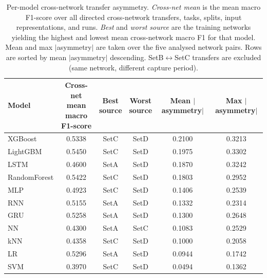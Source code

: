 \begin{table}[htbp]
\caption{Per-model cross-network transfer asymmetry. \textit{Cross-net mean} is the mean macro F1-score over all directed cross-network transfers, tasks, splits, input representations, and runs. \textit{Best} and \textit{worst source} are the training networks yielding the highest and lowest mean cross-network macro F1 for that model. Mean and max $|$asymmetry$|$ are taken over the five analysed network pairs. Rows are sorted by mean $|$asymmetry$|$ descending. SetB$\leftrightarrow$SetC transfers are excluded (same network, different capture period).}
\label{tab:q4_models}
\centering
\begin{tabular}{lccccc}
\toprule
Model & \makecell{Cross-net mean \\ macro F1-score} & \makecell{Best \\ source} & \makecell{Worst \\ source} & Mean $|$asymmetry$|$ & Max $|$asymmetry$|$ \\
\midrule
XGBoost & 0.5338 & SetC & SetD & 0.2100 & 0.3213 \\
LightGBM & 0.5450 & SetC & SetD & 0.1975 & 0.3302 \\
LSTM & 0.4600 & SetA & SetD & 0.1870 & 0.3242 \\
RandomForest & 0.5422 & SetC & SetD & 0.1803 & 0.2952 \\
MLP & 0.4923 & SetC & SetD & 0.1406 & 0.2539 \\
RNN & 0.5155 & SetA & SetD & 0.1332 & 0.2314 \\
GRU & 0.5258 & SetA & SetD & 0.1300 & 0.2648 \\
NN & 0.4300 & SetA & SetC & 0.1083 & 0.2529 \\
kNN & 0.4358 & SetC & SetD & 0.1000 & 0.2058 \\
LR & 0.5296 & SetA & SetD & 0.0944 & 0.1742 \\
SVM & 0.3970 & SetC & SetD & 0.0494 & 0.1362 \\
\bottomrule
\end{tabular}
\end{table}